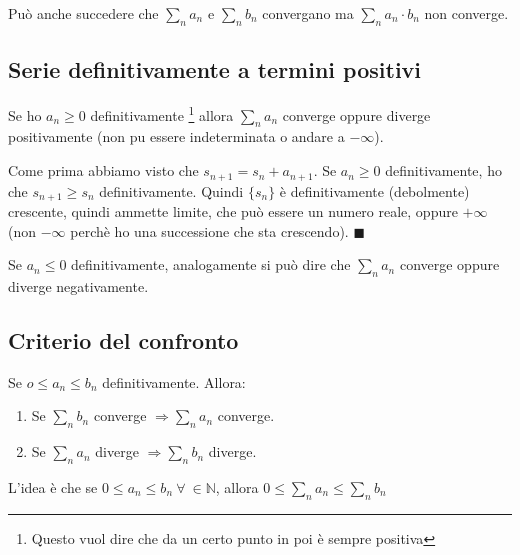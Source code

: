 \hspace{-15pt}Può anche succedere che $\sum_n a_n$ e $\sum_n b_n$ convergano ma $\sum_n a_n \cdot b_n$ non converge.

\subsection{Serie definitivamente a termini positivi}
\begin{theorem}
Se ho $a_n \geq 0$ definitivamente \footnote{Questo vuol dire che da un certo punto in poi è sempre positiva} allora $\sum_n a_n$ converge oppure diverge positivamente (non pu essere indeterminata o andare a $-\infty$).
\end{theorem}

\begin{demostration}
Come prima abbiamo visto che $s_{n+1} = s_n + a_{n+1}$. Se $a_n \geq 0$ definitivamente, ho che $s_{n+1} \geq s_n$ definitivamente. Quindi $\{s_n\}$ è definitivamente (debolmente) crescente, quindi ammette limite, che può essere un numero reale, oppure $+\infty$ (non $-\infty$ perchè ho una successione che sta crescendo). $\blacksquare$
\end{demostration}

\begin{observation}
Se $a_n \leq 0$ definitivamente, analogamente si può dire che $\sum_n a_n$ converge oppure diverge negativamente.
\end{observation}

\subsection{Criterio del confronto}
\begin{theorem}
Se $o \leq a_n \leq b_n$ definitivamente. Allora:
\begin{enumerate}
    \item Se $\sum_n b_n$ converge $\Longrightarrow \sum_n a_n$ converge.
    \item Se $\sum_n a_n$ diverge $\Longrightarrow \sum_n b_n$ diverge. 
\end{enumerate}
\end{theorem}

L'idea è che se $0 \leq a_n \leq b_n \: \forall \: \in \mathbb{N}$, allora $0 \leq \sum_n a_n \leq \sum_n b_n$

